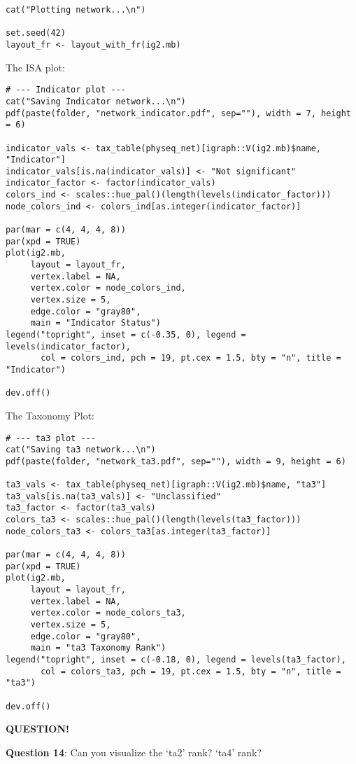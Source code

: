 \documentclass[
]{book}
\newenvironment{bluebox}{
  \definecolor{shadecolor}{RGB}{172, 210, 237}
  \color{white}
  \begin{shaded}}
 {\end{shaded}}
\begin{document}
\begin{verbatim}
cat("Plotting network...\n")

set.seed(42)
layout_fr <- layout_with_fr(ig2.mb)
\end{verbatim}

The ISA plot:

\begin{verbatim}
# --- Indicator plot ---
cat("Saving Indicator network...\n")
pdf(paste(folder, "network_indicator.pdf", sep=""), width = 7, height = 6)

indicator_vals <- tax_table(physeq_net)[igraph::V(ig2.mb)$name, "Indicator"]
indicator_vals[is.na(indicator_vals)] <- "Not significant"
indicator_factor <- factor(indicator_vals)
colors_ind <- scales::hue_pal()(length(levels(indicator_factor)))
node_colors_ind <- colors_ind[as.integer(indicator_factor)]

par(mar = c(4, 4, 4, 8))
par(xpd = TRUE)
plot(ig2.mb,
     layout = layout_fr,
     vertex.label = NA,
     vertex.color = node_colors_ind,
     vertex.size = 5,
     edge.color = "gray80",
     main = "Indicator Status")
legend("topright", inset = c(-0.35, 0), legend = levels(indicator_factor),
       col = colors_ind, pch = 19, pt.cex = 1.5, bty = "n", title = "Indicator")

dev.off()
\end{verbatim}

The Taxonomy Plot:

\begin{verbatim}
# --- ta3 plot ---
cat("Saving ta3 network...\n")
pdf(paste(folder, "network_ta3.pdf", sep=""), width = 9, height = 6)

ta3_vals <- tax_table(physeq_net)[igraph::V(ig2.mb)$name, "ta3"]
ta3_vals[is.na(ta3_vals)] <- "Unclassified"
ta3_factor <- factor(ta3_vals)
colors_ta3 <- scales::hue_pal()(length(levels(ta3_factor)))
node_colors_ta3 <- colors_ta3[as.integer(ta3_factor)]

par(mar = c(4, 4, 4, 8))
par(xpd = TRUE)
plot(ig2.mb,
     layout = layout_fr,
     vertex.label = NA,
     vertex.color = node_colors_ta3,
     vertex.size = 5,
     edge.color = "gray80",
     main = "ta3 Taxonomy Rank")
legend("topright", inset = c(-0.18, 0), legend = levels(ta3_factor),
       col = colors_ta3, pch = 19, pt.cex = 1.5, bty = "n", title = "ta3")

dev.off()
\end{verbatim}

\begin{bluebox}

\begin{center}
\textbf{QUESTION!}

\end{center}

\textbf{Question 14}: Can you visualize the `ta2' rank? `ta4' rank?

\end{bluebox}
\end{document}

